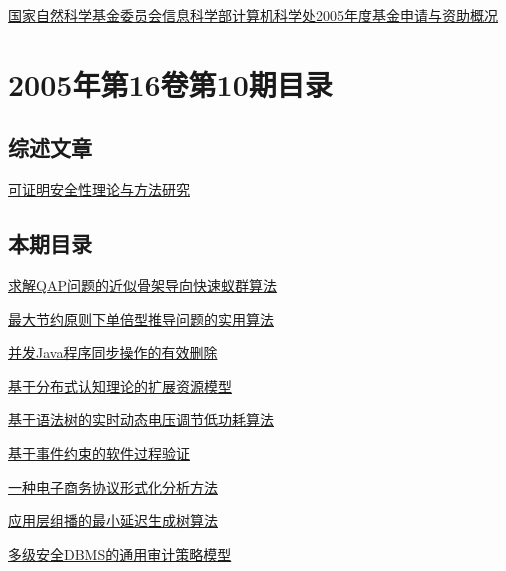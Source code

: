\documentclass[a4paper]{article}
\begin{document}
\href{http://www.jos.org.cn/ch/reader/download_pdf.aspx?file_no=20051120&year_id=2005&quarter_id=11&falg=1}{国家自然科学基金委员会信息科学部计算机科学处2005年度基金申请与资助概况}


\section{\textbf{2005年第16卷第10期目录}}
\subsection{综述文章}
\href{http://www.jos.org.cn/ch/reader/download_pdf.aspx?file_no=20051007&year_id=2005&quarter_id=10&falg=1}{可证明安全性理论与方法研究}

\subsection{本期目录}
\href{http://www.jos.org.cn/ch/reader/download_pdf.aspx?file_no=20051001&year_id=2005&quarter_id=10&falg=1}{求解QAP问题的近似骨架导向快速蚁群算法}

\href{http://www.jos.org.cn/ch/reader/download_pdf.aspx?file_no=20051002&year_id=2005&quarter_id=10&falg=1}{最大节约原则下单倍型推导问题的实用算法}

\href{http://www.jos.org.cn/ch/reader/download_pdf.aspx?file_no=20051003&year_id=2005&quarter_id=10&falg=1}{并发Java程序同步操作的有效删除}

\href{http://www.jos.org.cn/ch/reader/download_pdf.aspx?file_no=20051004&year_id=2005&quarter_id=10&falg=1}{基于分布式认知理论的扩展资源模型}

\href{http://www.jos.org.cn/ch/reader/download_pdf.aspx?file_no=20051005&year_id=2005&quarter_id=10&falg=1}{基于语法树的实时动态电压调节低功耗算法}

\href{http://www.jos.org.cn/ch/reader/download_pdf.aspx?file_no=20051006&year_id=2005&quarter_id=10&falg=1}{基于事件约束的软件过程验证}

\href{http://www.jos.org.cn/ch/reader/download_pdf.aspx?file_no=20051008&year_id=2005&quarter_id=10&falg=1}{一种电子商务协议形式化分析方法}

\href{http://www.jos.org.cn/ch/reader/download_pdf.aspx?file_no=20051009&year_id=2005&quarter_id=10&falg=1}{应用层组播的最小延迟生成树算法}

\href{http://www.jos.org.cn/ch/reader/download_pdf.aspx?file_no=20051010&year_id=2005&quarter_id=10&falg=1}{多级安全DBMS的通用审计策略模型}
\end{document}
